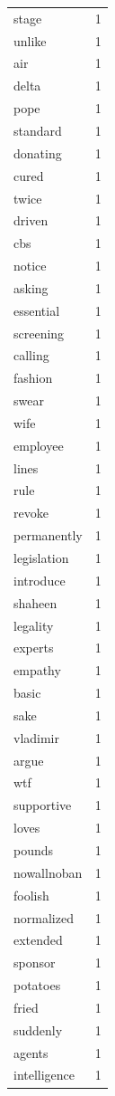 \begin{tabular}{lr}
stage & 1 \\
unlike & 1 \\
air & 1 \\
delta & 1 \\
pope & 1 \\
standard & 1 \\
donating & 1 \\
cured & 1 \\
twice & 1 \\
driven & 1 \\
cbs & 1 \\
notice & 1 \\
asking & 1 \\
essential & 1 \\
screening & 1 \\
calling & 1 \\
fashion & 1 \\
swear & 1 \\
wife & 1 \\
employee & 1 \\
lines & 1 \\
rule & 1 \\
revoke & 1 \\
permanently & 1 \\
legislation & 1 \\
introduce & 1 \\
shaheen & 1 \\
legality & 1 \\
experts & 1 \\
empathy & 1 \\
basic & 1 \\
sake & 1 \\
vladimir & 1 \\
argue & 1 \\
wtf & 1 \\
supportive & 1 \\
loves & 1 \\
pounds & 1 \\
nowallnoban & 1 \\
foolish & 1 \\
normalized & 1 \\
extended & 1 \\
sponsor & 1 \\
potatoes & 1 \\
fried & 1 \\
suddenly & 1 \\
agents & 1 \\
intelligence & 1 \\

\end{tabular}
